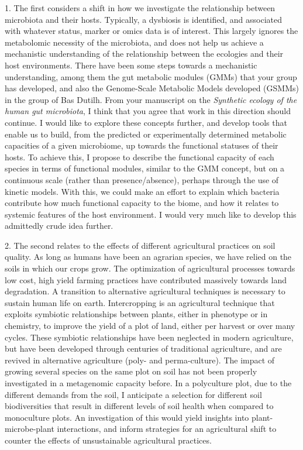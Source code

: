 \documentclass[letterpaper, 10pt]{article} %
\begin{document}
\begin{tcolorbox}[
	blanker,
	width=0.95\textwidth,
	enlarge left by=0.025\textwidth,
	enlarge right by=0.025\textwidth,
	before skip=6pt,
	breakable]
1. The first considers a shift in how we investigate the relationship between microbiota and their hosts. Typically, a dysbiosis is identified, and associated with whatever status, marker or omics data is of interest. This largely ignores the metabolomic necessity of the microbiota, and does not help us achieve a mechanistic understanding of the relationship between the ecologies and their host environments. There have been some steps towards a mechanistic understanding, among them the gut metabolic modules (GMMs) that your group has developed, and also the Genome-Scale Metabolic Models developed (GSMMs) in the group of Bas Dutilh. From your manuscript on the \textit{Synthetic ecology of the human gut microbiota}, I think that you agree that work in this direction should continue. I would like to explore these concepts further, and develop tools that enable us to build, from the predicted or experimentally determined metabolic capacities of a given microbiome, up towards the functional statuses of their hosts. To achieve this, I propose to describe the functional capacity of each species in terms of functional modules, similar to the GMM concept, but on a continuous scale (rather than presence/absence), perhaps through the use of kinetic models. With this, we could make an effort to explain which bacteria contribute how much functional capacity to the biome, and how it relates to systemic features of the host environment. I would very much like to develop this admittedly crude idea further.

2. The second relates to the effects of different agricultural practices on soil quality. As long as humans have been an agrarian species, we have relied on the soils in which our crops grow. The optimization of agricultural processes towards low cost, high yield farming practices have contributed massively towards land degradation. A transition to alternative agricultural techniques is necessary to sustain human life on earth. Intercropping is an agricultural technique that exploits symbiotic relationships between plants, either in phenotype or in chemistry, to improve the yield of a plot of land, either per harvest or over many cycles. These symbiotic relationships have been neglected in modern agriculture, but have been developed through centuries of traditional agriculture, and are revived in alternative agriculture (poly- and perma-culture). The impact of growing several species on the same plot on soil has not been properly investigated in a metagenomic capacity before. In a polyculture plot, due to the different demands from the soil, I anticipate a selection for different soil biodiversities that result in different levels of soil health when compared to monoculture plots. An investigation of this would yield insights into plant-microbe-plant interactions, and inform strategies for an agricultural shift to counter the effects of unsustainable agricultural practices.


\end{tcolorbox}
\end{document}
